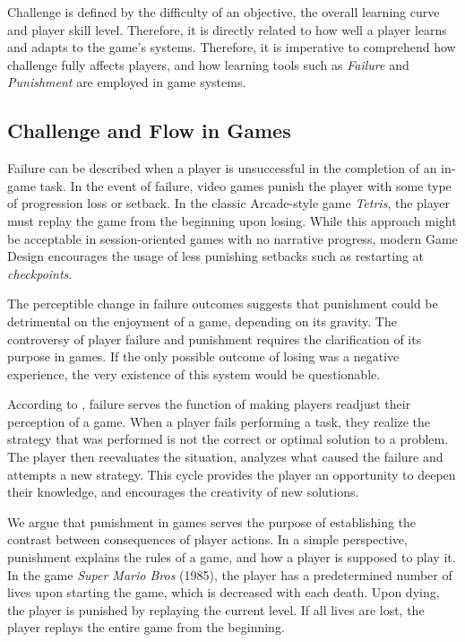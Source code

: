 Challenge is defined by the difficulty of an objective, the overall learning curve and player skill level. Therefore, it is directly related to how well a player learns and adapts to the game's systems. Therefore, it is imperative to comprehend how challenge fully affects players, and how learning tools such as \emph{Failure} and \emph{Punishment} are employed in game systems.

\subsection{Challenge and Flow in Games}
\label{sec:challenge-flow}

Failure can be described when a player is unsuccessful in the completion of an in-game task. In the event of failure, video games punish the player with some type of progression loss or setback. In the classic Arcade-style game \emph{Tetris}, the player must replay the game from the beginning upon losing. While this approach might be acceptable in session-oriented games with no narrative progress, modern Game Design encourages the usage of less punishing setbacks such as restarting at \emph{checkpoints}. 

The perceptible change in failure outcomes suggests that punishment could be detrimental on the enjoyment of a game, depending on its gravity. The controversy of player failure and punishment requires the clarification of its purpose in games. If the only possible outcome of losing was a negative experience, the very existence of this system would be questionable.

According to \cite{ARTICLE_FearOfFailure}, failure serves the function of making players readjust their perception of a game. When a player fails performing a task, they realize the strategy that was performed is not the correct or optimal solution to a problem. The player then reevaluates the situation, analyzes what caused the failure and attempts a new strategy. This cycle provides the player an opportunity to deepen their knowledge, and encourages the creativity of new solutions.

We argue that punishment in games serves the purpose of establishing the contrast between consequences of player actions. In a simple perspective, punishment explains the rules of a game, and how a player is supposed to play it. In the game \emph{Super Mario Bros} (1985), the player has a predetermined number of lives upon starting the game, which is decreased with each death. Upon dying, the player is punished by replaying the current level. If all lives are lost, the player replays the entire game from the beginning.

